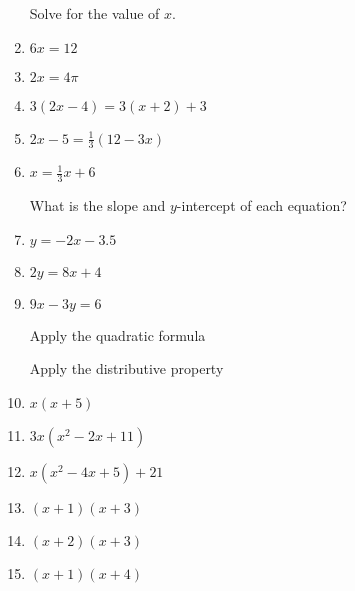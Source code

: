 \documentclass[12pt, twoside]{article}
\begin{document}
\begin{enumerate}
  \newpage
Solve for the value of $x$.
  \item   $6x=12$ \vspace{2cm}
  \item   $2x=4\pi$ \vspace{2cm}

  \item   $3(2x-4)=3(x+2)+3$ \vspace{4.5cm}
  \item   $2x-5=\frac{1}{3}(12-3x)$ \vspace{4.5cm}
  \item   $x=\frac{1}{3}x+6$ \vspace{3cm}

  \newpage
What is the slope and $y$-intercept of each equation?
  \item   $y=-2x-3.5$ \vspace{2cm}
  \item   $2y=8x+4$ \vspace{2cm}
  \item   $9x-3y=6$ \vspace{3cm}

\newpage
Apply the quadratic formula


\newpage
Apply the distributive property
  \item $x(x+5)$ \vspace{2cm}
  \item $3x(x^2-2x+11)$ \vspace{2.5cm}
  \item $x(x^2-4x+5)+21$  \vspace{2.5cm}
  \item $(x+1)(x+3)$ \vspace{3cm}
  \item $(x+2)(x+3)$ \vspace{3cm}
  \item $(x+1)(x+4)$ \vspace{3cm}


\end{enumerate}
\end{document}
